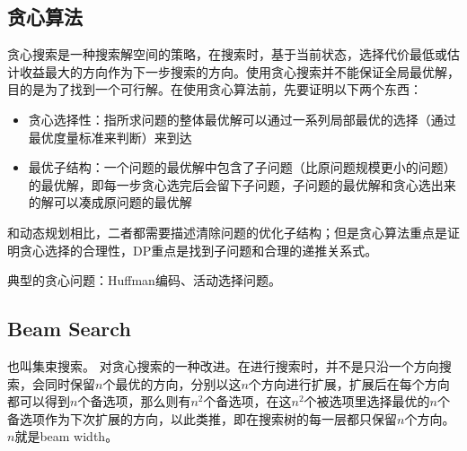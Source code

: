 \subsection{贪心算法}
贪心搜索是一种搜索解空间的策略，在搜索时，基于当前状态，选择代价最低或估计收益最大的方向作为下一步搜索的方向。使用贪心搜索并不能保证全局最优解，目的是为了找到一个可行解。在使用贪心算法前，先要证明以下两个东西：
\begin{itemize}
	\item 贪心选择性：指所求问题的整体最优解可以通过一系列局部最优的选择（通过最优度量标准来判断）来到达
	\item 最优子结构：一个问题的最优解中包含了子问题（比原问题规模更小的问题）的最优解，即每一步贪心选完后会留下子问题，子问题的最优解和贪心选出来的解可以凑成原问题的最优解
\end{itemize}
和动态规划相比，二者都需要描述清除问题的优化子结构；但是贪心算法重点是证明贪心选择的合理性，DP重点是找到子问题和合理的递推关系式。

典型的贪心问题：Huffman编码、活动选择问题。



\subsection{Beam Search}
也叫集束搜索。
对贪心搜索的一种改进。在进行搜索时，并不是只沿一个方向搜索，会同时保留$n$个最优的方向，分别以这$n$个方向进行扩展，扩展后在每个方向都可以得到$n$个备选项，那么则有$n^2$个备选项，在这$n^2$个被选项里选择最优的$n$个备选项作为下次扩展的方向，以此类推，即在搜索树的每一层都只保留$n$个方向。$n$就是beam width。


